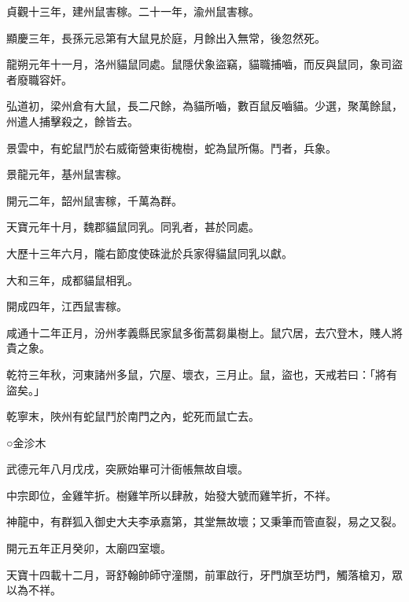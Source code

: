 \begin{pinyinscope}
 貞觀十三年，建州鼠害稼。二十一年，渝州鼠害稼。



 顯慶三年，長孫元忌第有大鼠見於庭，月餘出入無常，後忽然死。



 龍朔元年十一月，洛州貓鼠同處。鼠隱伏象盜竊，貓職捕嚙，而反與鼠同，象司盜者廢職容奸。



 弘道初，梁州倉有大鼠，長二尺餘，為貓所嚙，數百鼠反嚙貓。少選，聚萬餘鼠，州遣人捕擊殺之，餘皆去。



 景雲中，有蛇鼠鬥於右威衛營東街槐樹，蛇為鼠所傷。鬥者，兵象。



 景龍元年，基州鼠害稼。



 開元二年，韶州鼠害稼，千萬為群。



 天寶元年十月，魏郡貓鼠同乳。同乳者，甚於同處。



 大歷十三年六月，隴右節度使硃泚於兵家得貓鼠同乳以獻。



 大和三年，成都貓鼠相乳。



 開成四年，江西鼠害稼。



 咸通十二年正月，汾州孝義縣民家鼠多銜蒿芻巢樹上。鼠穴居，去穴登木，賤人將貴之象。



 乾符三年秋，河東諸州多鼠，穴屋、壞衣，三月止。鼠，盜也，天戒若曰：「將有盜矣。」



 乾寧末，陜州有蛇鼠鬥於南門之內，蛇死而鼠亡去。



 ○金沴木



 武德元年八月戊戌，突厥始畢可汁衙帳無故自壞。



 中宗即位，金雞竿折。樹雞竿所以肆赦，始發大號而雞竿折，不祥。



 神龍中，有群狐入御史大夫李承嘉第，其堂無故壞；又秉筆而管直裂，易之又裂。



 開元五年正月癸卯，太廟四室壞。



 天寶十四載十二月，哥舒翰帥師守潼關，前軍啟行，牙門旗至坊門，觸落槍刃，眾以為不祥。




\end{pinyinscope}
